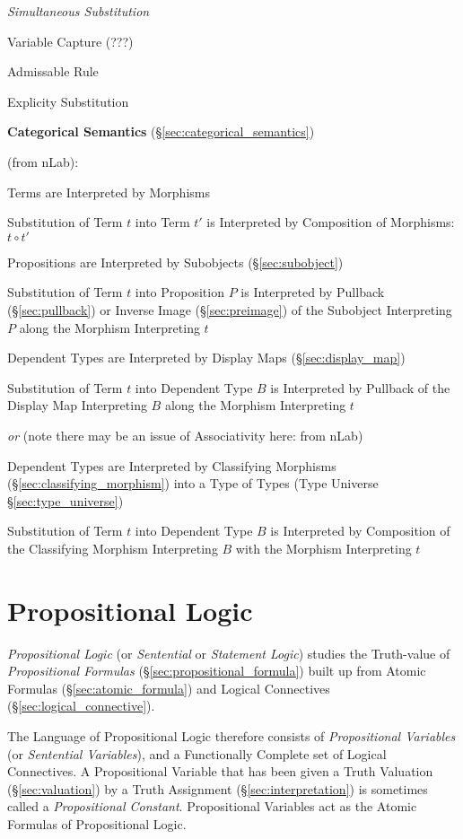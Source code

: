 \emph{Simultaneous Substitution}

Variable Capture (???)

Admissable Rule

Explicity Substitution


\textbf{Categorical Semantics} (\S\ref{sec:categorical_semantics})

(from nLab): %

Terms are Interpreted by Morphisms

Substitution of Term $t$ into Term $t'$ is Interpreted by Composition
of Morphisms: $t \circ t'$

Propositions are Interpreted by Subobjects (\S\ref{sec:subobject})

Substitution of Term $t$ into Proposition $P$ is Interpreted by
Pullback (\S\ref{sec:pullback}) or Inverse Image
(\S\ref{sec:preimage}) of the Subobject Interpreting $P$ along the
Morphism Interpreting $t$

Dependent Types are Interpreted by Display Maps
(\S\ref{sec:display_map})

Substitution of Term $t$ into Dependent Type $B$ is Interpreted by
Pullback of the Display Map Interpreting $B$ along the Morphism
Interpreting $t$

\emph{or} (note there may be an issue of Associativity here: from nLab)

Dependent Types are Interpreted by Classifying Morphisms
(\S\ref{sec:classifying_morphism}) into a Type of Types (Type Universe
\S\ref{sec:type_universe})

Substitution of Term $t$ into Dependent Type $B$ is Interpreted by
Composition of the Classifying Morphism Interpreting $B$ with the
Morphism Interpreting $t$



\section{Propositional Logic}\label{sec:propositional_logic}

\emph{Propositional Logic} (or \emph{Sentential} or \emph{Statement
  Logic}) studies the Truth-value of \emph{Propositional Formulas}
(\S\ref{sec:propositional_formula}) built up from Atomic Formulas
(\S\ref{sec:atomic_formula}) and Logical Connectives
(\S\ref{sec:logical_connective}).

The Language of Propositional Logic therefore consists of
\emph{Propositional Variables} (or \emph{Sentential Variables}), and a
Functionally Complete set of Logical Connectives. A Propositional
Variable that has been given a Truth Valuation (\S\ref{sec:valuation})
by a Truth Assignment (\S\ref{sec:interpretation}) is sometimes called
a \emph{Propositional Constant}. Propositional Variables act as the
Atomic Formulas of Propositional Logic.

